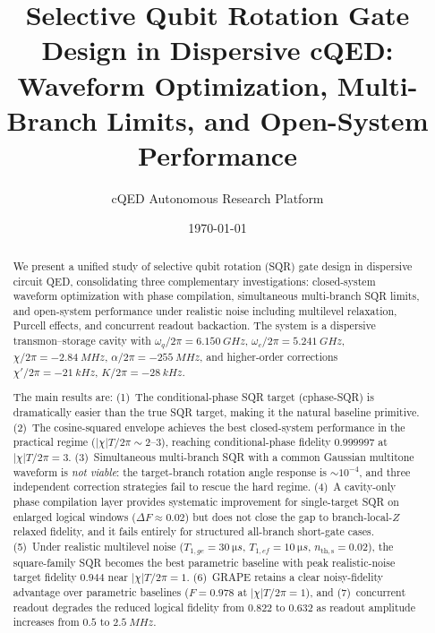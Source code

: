 \documentclass[aps,pra,twocolumn,reprint,amsmath,amssymb]{revtex4-2}
\begin{document}
\title{Selective Qubit Rotation Gate Design in Dispersive cQED:
Waveform Optimization, Multi-Branch Limits, and Open-System Performance}
\author{cQED Autonomous Research Platform}
\date{\today}

\begin{abstract}
We present a unified study of selective qubit rotation (SQR) gate design in dispersive circuit QED, consolidating three complementary investigations: closed-system waveform optimization with phase compilation, simultaneous multi-branch SQR limits, and open-system performance under realistic noise including multilevel relaxation, Purcell effects, and concurrent readout backaction. The system is a dispersive transmon--storage cavity with $\omega_q/2\pi=\SI{6.150}{GHz}$, $\omega_c/2\pi=\SI{5.241}{GHz}$, $\chi/2\pi=\SI{-2.84}{MHz}$, $\alpha/2\pi=\SI{-255}{MHz}$, and higher-order corrections $\chi'/2\pi=\SI{-21}{kHz}$, $K/2\pi=\SI{-28}{kHz}$.

The main results are: (1)~The conditional-phase SQR target (cphase-SQR) is dramatically easier than the true SQR target, making it the natural baseline primitive. (2)~The cosine-squared envelope achieves the best closed-system performance in the practical regime ($|\chi|T/2\pi\sim 2$--$3$), reaching conditional-phase fidelity $0.999997$ at $|\chi|T/2\pi=3$. (3)~Simultaneous multi-branch SQR with a common Gaussian multitone waveform is \emph{not viable}: the target-branch rotation angle response is $\sim 10^{-4}$, and three independent correction strategies fail to rescue the hard regime. (4)~A cavity-only phase compilation layer provides systematic improvement for single-target SQR on enlarged logical windows ($\Delta F\approx 0.02$) but does not close the gap to branch-local-$Z$ relaxed fidelity, and it fails entirely for structured all-branch short-gate cases. (5)~Under realistic multilevel noise ($T_{1,ge}=\SI{30}{\micro s}$, $T_{1,ef}=\SI{10}{\micro s}$, $n_\mathrm{th,s}=0.02$), the square-family SQR becomes the best parametric baseline with peak realistic-noise target fidelity $0.944$ near $|\chi|T/2\pi=1$. (6)~GRAPE retains a clear noisy-fidelity advantage over parametric baselines ($F=0.978$ at $|\chi|T/2\pi=1$), and (7)~concurrent readout degrades the reduced logical fidelity from $0.822$ to $0.632$ as readout amplitude increases from $0.5$ to $\SI{2.5}{MHz}$.
\end{abstract}
\end{document}
